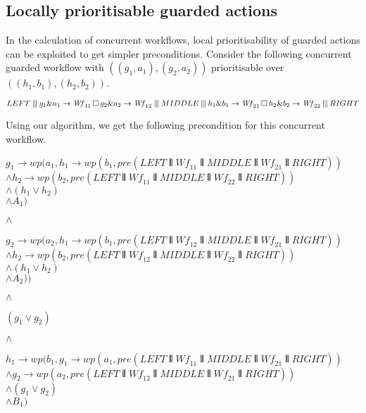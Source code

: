 \documentclass[11pt]{article}
\newcommand{\Wf}{\mathit{Wf}}
\begin{document}
\subsection{Locally prioritisable guarded actions}
\label{sec:loc_indep}

In the calculation of concurrent workflows, local prioritisability of guarded actions can be exploited to get simpler preconditions. Consider the following concurrent guarded workflow with $((g_1,a_1),(g_2,a_2))$ prioritisable over $((h_1,b_1),(h_2,b_2))$.

\noindent
$LEFT \interleave
 g_1 \& a_1 \Prefix \Wf_{11} \Extchoice g_2 \& a_2 \Prefix \Wf_{12} \interleave 
 MIDDLE \interleave
 h_1 \& b_1 \Prefix \Wf_{21} \Extchoice h_2 \& b_2 \Prefix \Wf_{22} \interleave
 RIGHT$
 
Using our algorithm, we get the following precondition for this concurrent workflow.

\noindent
$g_1 \longrightarrow wp(a_1,h_1 \longrightarrow wp(b_1,pre(LEFT \interleave \Wf_{11} \interleave MIDDLE \interleave \Wf_{21} \interleave RIGHT))$ \\
\hspace*{60pt}          $\land h_2 \longrightarrow wp(b_2,pre(LEFT \interleave \Wf_{11} \interleave MIDDLE \interleave \Wf_{22} \interleave RIGHT))$ \\
\hspace*{60pt}          $\land (h_1 \lor h_2)$ \\
\hspace*{60pt} $\land A_1)$ 

\noindent
$\land$

\noindent
$g_2 \longrightarrow wp(a_2,h_1 \longrightarrow wp(b_1,pre(LEFT \interleave \Wf_{12} \interleave MIDDLE \interleave \Wf_{21} \interleave RIGHT))$ \\
\hspace*{60pt}       $\land h_2 \longrightarrow wp(b_2,pre(LEFT \interleave \Wf_{12} \interleave MIDDLE \interleave \Wf_{22} \interleave RIGHT))$ \\ 
\hspace*{60pt}       $\land (h_1 \lor h_2)$ \\
\hspace*{60pt}       $\land A_2))$

\noindent
$\land$

\noindent
$(g_1 \lor g_2)$

\noindent
$\land$

\noindent
$h_1 \longrightarrow wp(b_1,g_1 \longrightarrow wp(a_1,pre(LEFT \interleave \Wf_{11} \interleave MIDDLE \interleave \Wf_{21} \interleave RIGHT))$ \\
\hspace*{60pt}        $\land g_2 \longrightarrow wp(a_2,pre(LEFT \interleave \Wf_{12} \interleave MIDDLE \interleave \Wf_{21} \interleave RIGHT))$ \\
\hspace*{60pt}        $\land (g_1 \lor g_2)$ \\ 
\hspace*{60pt}        $\land B_1)$ 
\end{document}
